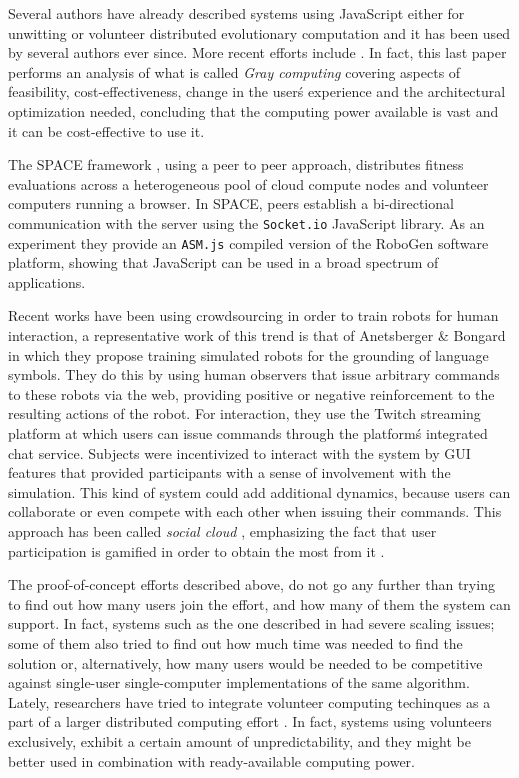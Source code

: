 \documentclass{llncs}
\begin{document}
Several authors have already described systems using JavaScript either
for unwitting
\cite{unwitting-ec,boldrin2007distributed,apolonia2012enhancing} or volunteer
\cite{langdon:2005:metas,gecco07:workshop:dcor} distributed
evolutionary computation and it has been used by several
authors ever since. More recent efforts include
\cite{duda2013distributed,DBLP:journals/corr/abs-0801-1210,EvoStar2014:jsEO,martinez2015capataz,pan2015gray}. In fact, this last paper \cite{pan2015gray} performs an analysis of what is called {\em Gray computing} covering aspects of
feasibility, cost-effectiveness, change in the user\'s experience and the
architectural optimization needed, concluding that the computing power
available is vast and it can be cost-effective to use it.

The SPACE framework \cite{leclerc2016seamless}, using a peer to peer approach, distributes fitness evaluations across a heterogeneous pool of cloud compute nodes and volunteer computers running a browser. In SPACE, peers establish a bi-directional communication with the server using the \texttt{Socket.io} JavaScript library.
As an experiment they provide an \texttt{ASM.js} compiled version of the RoboGen software platform, showing that JavaScript can be used in a broad
spectrum of applications.

Recent works have been using crowdsourcing in order to train robots
for human interaction, a representative work of this trend is that of
Anetsberger \& Bongard \cite{anetsbergerrobots} in which they propose
training simulated robots for the grounding of language symbols. They do this by using human observers that issue arbitrary commands to these robots via the web, providing positive or negative reinforcement to the resulting actions of the robot. For interaction, they use the Twitch streaming platform at which users can issue commands through the
platform\'s integrated chat service. Subjects were incentivized to
interact with the system by GUI features that provided participants
with a sense of involvement with the simulation. This kind of system
could add additional dynamics, because users can collaborate or
even compete with each other when issuing their commands. This approach has been called {\em social cloud} \cite{6404452}, emphasizing the fact that user participation is gamified in order to obtain the most from it \cite{7027564}.

The proof-of-concept efforts described above, do not go any further than trying to find out how many users join the effort, and how many of them the system can support. In fact, systems such as the one described in
\cite{gecco07:workshop:dcor} had severe scaling issues; some of them
also tried to find out how much time was needed to find the solution
or, alternatively, how many users would be needed to be competitive
against single-user single-computer implementations of the same
algorithm. Lately, researchers have tried to integrate volunteer computing techinques as a part of a larger distributed computing effort \cite{leclerc2016seamless}.  In fact, systems using volunteers exclusively, exhibit a certain amount of unpredictability, and they might be better used in combination with ready-available computing power.
\end{document}
